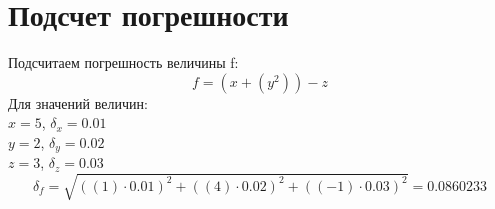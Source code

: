 \documentclass[a4paper,12pt]{article} %
\begin{document}
\newpage 
 \section{Подсчет погрешности} 
 Подсчитаем погрешность величины f: \\
\[ f = {({x} + {({y} ^ {{2}})})} - {z}\]
Для значений величин: \\$x = 5$, $\delta_{x} = 0.01$\\$y = 2$, $\delta_{y} = 0.02$\\$z = 3$, $\delta_{z} = 0.03$\\\[\delta_{f} = \sqrt{((1) \cdot 0.01)^2 + ((4) \cdot 0.02)^2 + ((-1) \cdot 0.03)^2} = 0.0860233 \]
\end{document}
